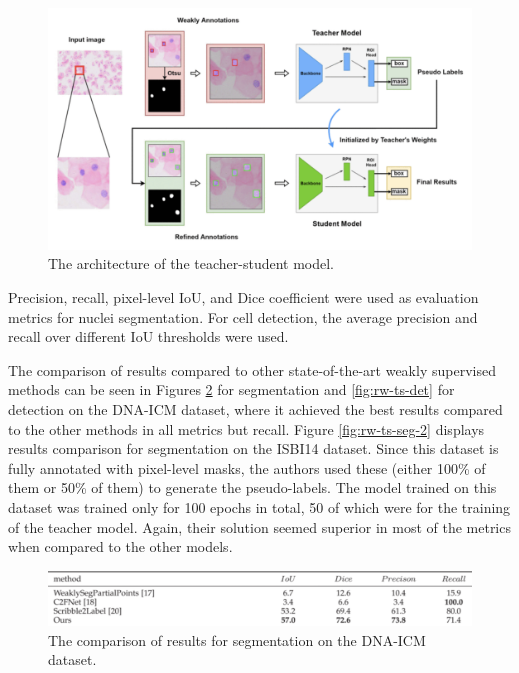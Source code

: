 \begin{figure}[H]
    \begin{centering}
    \includegraphics[width=14cm]{assets/images/rw-teacher-student.png}
    \par\end{centering}
    \caption{The architecture of the teacher-student model.}
    \label{fig:rw-teacher-student}
\end{figure}

Precision, recall, pixel-level IoU, and Dice coefficient were used as evaluation metrics for nuclei segmentation. For cell detection, the average precision and recall over different IoU thresholds were used.

The comparison of results compared to other state-of-the-art weakly supervised methods can be seen in Figures \ref{fig:rw-ts-seg} for segmentation and \ref{fig:rw-ts-det} for detection on the DNA-ICM dataset, where it achieved the best results compared to the other methods in all metrics but recall. Figure \ref{fig:rw-ts-seg-2} displays results comparison for segmentation on the ISBI14 dataset. Since this dataset is fully annotated with pixel-level masks, the authors used these (either 100\% of them or 50\% of them) to generate the pseudo-labels. The model trained on this dataset was trained only for 100 epochs in total, 50 of which were for the training of the teacher model. Again, their solution seemed superior in most of the metrics when compared to the other models.

\begin{figure}[H]
    \begin{centering}
    \includegraphics[width=14cm]{assets/images/rw-ts-seg.png}
    \par\end{centering}
    \caption{The comparison of results for segmentation on the DNA-ICM dataset.}
    \label{fig:rw-ts-seg}
\end{figure}

